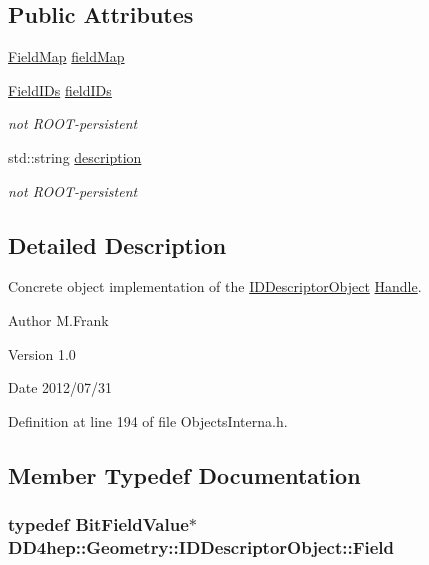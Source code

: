 \subsection*{Public Attributes}
\begin{DoxyCompactItemize}
\item 
\hyperlink{class_d_d4hep_1_1_geometry_1_1_i_d_descriptor_object_a784af03aa08575a914c2399b45eae052}{FieldMap} \hyperlink{class_d_d4hep_1_1_geometry_1_1_i_d_descriptor_object_a56d35066c16243ed986ee35c789b5a2a}{fieldMap}
\item 
\hyperlink{class_d_d4hep_1_1_geometry_1_1_i_d_descriptor_object_aa9d779170fd1d2221d27f3b63df6d6d4}{FieldIDs} \hyperlink{class_d_d4hep_1_1_geometry_1_1_i_d_descriptor_object_a5f76652b444d990c08435cf7fdc0e4ea}{fieldIDs}
\begin{DoxyCompactList}\small\item\em not ROOT-\/persistent \item\end{DoxyCompactList}\item 
std::string \hyperlink{class_d_d4hep_1_1_geometry_1_1_i_d_descriptor_object_a2f745060e365a31cb36186dacf26204c}{description}
\begin{DoxyCompactList}\small\item\em not ROOT-\/persistent \item\end{DoxyCompactList}\end{DoxyCompactItemize}


\subsection{Detailed Description}
Concrete object implementation of the \hyperlink{class_d_d4hep_1_1_geometry_1_1_i_d_descriptor_object}{IDDescriptorObject} \hyperlink{class_d_d4hep_1_1_handle}{Handle}. \begin{DoxyAuthor}{Author}
M.Frank 
\end{DoxyAuthor}
\begin{DoxyVersion}{Version}
1.0 
\end{DoxyVersion}
\begin{DoxyDate}{Date}
2012/07/31 
\end{DoxyDate}


Definition at line 194 of file ObjectsInterna.h.

\subsection{Member Typedef Documentation}
\hypertarget{class_d_d4hep_1_1_geometry_1_1_i_d_descriptor_object_acd5cae904f0db0ed0805ef1077ce2111}{
\subsubsection[{Field}]{\setlength{\rightskip}{0pt plus 5cm}typedef BitFieldValue$\ast$ {\bf DD4hep::Geometry::IDDescriptorObject::Field}}}
\label{class_d_d4hep_1_1_geometry_1_1_i_d_descriptor_object_acd5cae904f0db0ed0805ef1077ce2111}


